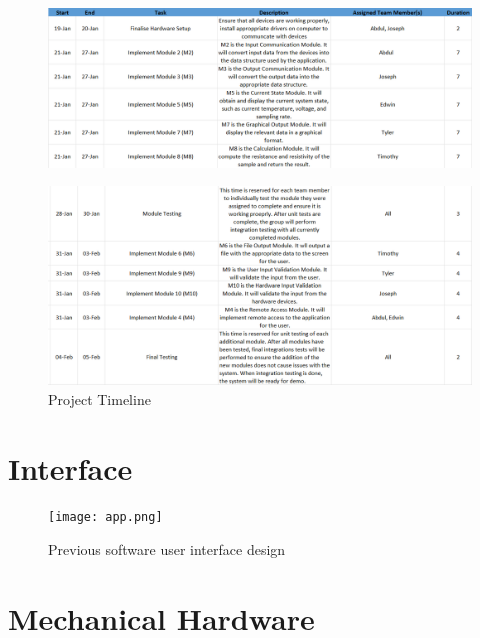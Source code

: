 \documentclass[12pt, titlepage]{article}
\begin{document}
\begin{figure}[H]
\centerline{\includegraphics[scale=1]{timeline_1.png}}
\end{figure}

\begin{figure}[H]
\centerline{\includegraphics[scale=1]{timeline_2.png}}
\caption{Project Timeline}
\label{fig}
\end{figure}



% 

\newpage{}

\appendix

\section{Interface}
\label{Apx.A}

\begin{figure}[H]
\centerline{\texttt{[image: app.png]}}
\caption{Previous software user interface design}
\label{fig}
\end{figure}

\section{Mechanical Hardware}
\hfill
\end{document}
